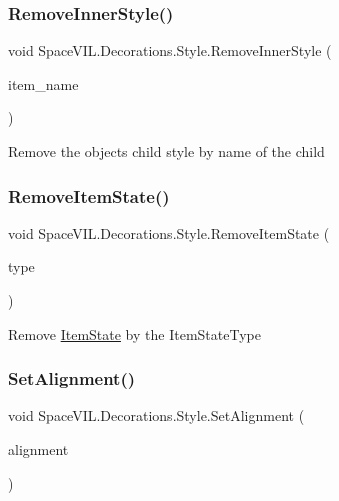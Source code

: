 \subsubsection{\texorpdfstring{Remove\+Inner\+Style()}{RemoveInnerStyle()}}
{\footnotesize\ttfamily void Space\+V\+I\+L.\+Decorations.\+Style.\+Remove\+Inner\+Style (\begin{DoxyParamCaption}\item[{String}]{item\+\_\+name }\end{DoxyParamCaption})}



Remove the object\textquotesingle{}s child style by name of the child 

\mbox{\label{class_space_v_i_l_1_1_decorations_1_1_style_a84dcc9ea332cd7950e166307050124a0}} 
\subsubsection{\texorpdfstring{Remove\+Item\+State()}{RemoveItemState()}}
{\footnotesize\ttfamily void Space\+V\+I\+L.\+Decorations.\+Style.\+Remove\+Item\+State (\begin{DoxyParamCaption}\item[{Item\+State\+Type}]{type }\end{DoxyParamCaption})}



Remove \mbox{\hyperlink{class_space_v_i_l_1_1_decorations_1_1_item_state}{Item\+State}} by the Item\+State\+Type 

\mbox{\label{class_space_v_i_l_1_1_decorations_1_1_style_a49dfa21104c12d8d2c0078f3bd9310aa}} 
\subsubsection{\texorpdfstring{Set\+Alignment()}{SetAlignment()}}
{\footnotesize\ttfamily void Space\+V\+I\+L.\+Decorations.\+Style.\+Set\+Alignment (\begin{DoxyParamCaption}\item[{Item\+Alignment}]{alignment }\end{DoxyParamCaption})}



